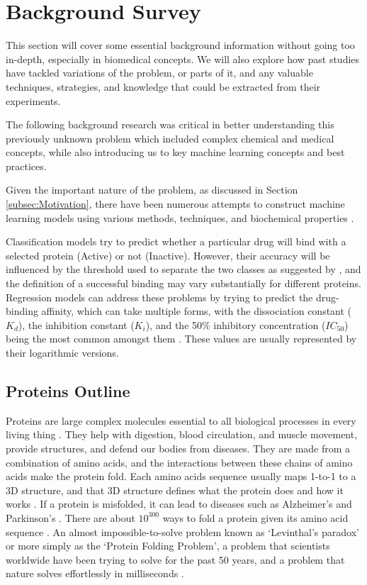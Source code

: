 \section{Background Survey}

This section will cover some essential background information without going too in-depth, especially in biomedical concepts. We will also explore how past studies have tackled variations of the problem, or parts of it, and any valuable techniques, strategies, and knowledge that could be extracted from their experiments.

The following background research was critical in better understanding this previously unknown problem which included complex chemical and medical concepts, while also introducing us to key machine learning concepts and best practices.

Given the important nature of the problem, as discussed in Section \ref{subsec:Motivation}, there have been numerous attempts to construct machine learning models using various methods, techniques, and biochemical properties \citep{Shar2016, Wang2020, Jiang2020}.

Classification models try to predict whether a particular drug will bind with a selected protein (Active) or not (Inactive). However, their accuracy will be influenced by the threshold used to separate the two classes as suggested by \cite{Shar2016}, and the definition of a successful binding may vary substantially for different proteins. Regression models can address these problems by trying to predict the drug-binding affinity, which can take multiple forms, with the dissociation constant ($K_d$), the inhibition constant ($K_i$), and the 50\% inhibitory concentration ($IC_{50}$) being the most common amongst them \citep{Jiang2020}. These values are usually represented by their logarithmic versions.


\subsection{Proteins Outline}

Proteins are large complex molecules essential to all biological processes in every living thing \citep{AlphaFold_Blog, CellBiologyEssentials}. They help with digestion, blood circulation, and muscle movement, provide structures, and defend our bodies from diseases. They are made from a combination of amino acids, and the interactions between these chains of amino acids make the protein fold. Each amino acids sequence usually maps 1-to-1 to a 3D structure, and that 3D structure defines what the protein does and how it works \citep{LexFridmanVideo}. If a protein is misfolded, it can lead to diseases such as Alzheimer's and Parkinson's \citep{Misfolding_Diseases}. There are about $10^{300}$ ways to fold a protein given its amino acid sequence \citep{Levinthal1969}. An almost impossible-to-solve problem known as `Levinthal's paradox' or more simply as the `Protein Folding Problem', a problem that scientists worldwide have been trying to solve for the past 50 years, and a problem that nature solves effortlessly in milliseconds \citep{AlphaFold_Blog, Torrisi2020}.

